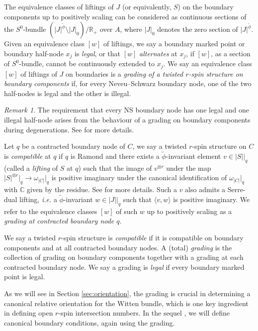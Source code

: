 \documentclass[11pt,a4paper]{article}
\theoremstyle{definition}
\theoremstyle{remark}
\newtheorem{rmk}[dummy]{Remark}
\numberwithin{equation}{section}
\begin{document}
 The equivalence classes of liftings of $J$ (or equivalently, $S$) on the boundary components up to positively scaling can be considered as continuous sections of the $S^0$-bundle $\left(|J|^{\widetilde{\phi}}\setminus |J|_0\right)\big/ \mathbb R_+$ over $A$, where $|J|_0$ denotes the zero section of $|J|^{\widetilde{\phi}}$. Given an equivalence class $[w]$  of liftings, we say a boundary marked point or boundary half-node $x_j$ is \textit{legal}, or that $[w]$ \textit{alternates} at $x_j$, if $[w]$, as a section of $S^0$-bundle, cannot be continuously extended to $x_j$.
We say an equivalence class $[w]$ of liftings of $J$ on boundaries is a \textit{grading of a twisted $r$-spin structure on boundary components} if, for every Neveu--Schwarz boundary node, one of the two half-nodes is legal and the other is illegal. 
\begin{rmk}
    The requirement that every NS boundary node has one legal and one illegal half-node arises from the behaviour of a grading on boundary components during degenerations. See \cite{BCT1} for more details.
\end{rmk}

Let $q$ be a contracted boundary node of $C$, we say a twisted $r$-spin structure on $C$ is \textit{compatible} at $q$ if $q$ is Ramond and there exists a $\widetilde{\phi}$-invariant element $v \in |S|\big|_q$  (called a \textit{lifting} of $S$ at $q$) such that the image of $v^{\otimes r}$ under the map $|S|^{\otimes r}\big|_q \to \omega_{|C|}\big|_q$ is positive imaginary under the canonical identification of $\omega_{|C|}\big|_q$ with ${\mathbb{C}}$ given by the residue. See \cite[Definition 2.8]{BCT1} for more details.  Such a $v$ also admits a Serre-dual lifting, \textit{i.e.}  a $\widetilde{\phi}$-invariant $w \in |J|\big\vert_q$ such that $\langle v, w \rangle$ is positive imaginary.  We refer to the equivalence classes $[w]$ of such $w$ up to positively scaling as a \textit{grading at contracted boundary node $q$}.

We say a twisted $r$-spin structure is \textit{compatible} if it is compatible on boundary components and at all contracted boundary nodes.  A (total) \textit{grading} is the collection of grading on boundary components together with a grading at each contracted boundary node. We say a grading is \textit{legal} if every boundary marked point is legal.


As we will see in Section \ref{sec:orientation}, the grading is crucial in determining a canonical relative orientation for the Witten bundle, which is one key ingredient in defining open $r$-spin intersection numbers. In the sequel \cite{TZ2}, we will define canonical boundary conditions, again using the grading.
\end{document}
